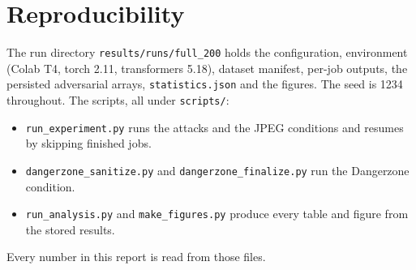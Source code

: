 \documentclass[11pt]{article}
\begin{document}
\section{Reproducibility}
The run directory \texttt{results/runs/full\_200} holds the configuration, environment
(Colab T4, torch 2.11, transformers 5.18), dataset manifest, per-job outputs, the
persisted adversarial arrays, \texttt{statistics.json} and the figures. The seed is 1234
throughout. The scripts, all under \texttt{scripts/}:
\begin{itemize}
\item \texttt{run\_experiment.py} runs the attacks and the JPEG conditions and resumes
by skipping finished jobs.
\item \texttt{dangerzone\_sanitize.py} and \texttt{dangerzone\_finalize.py} run the
Dangerzone condition.
\item \texttt{run\_analysis.py} and \texttt{make\_figures.py} produce every table and
figure from the stored results.
\end{itemize}
Every number in this report is read from those files.

\printbibliography
\end{document}
